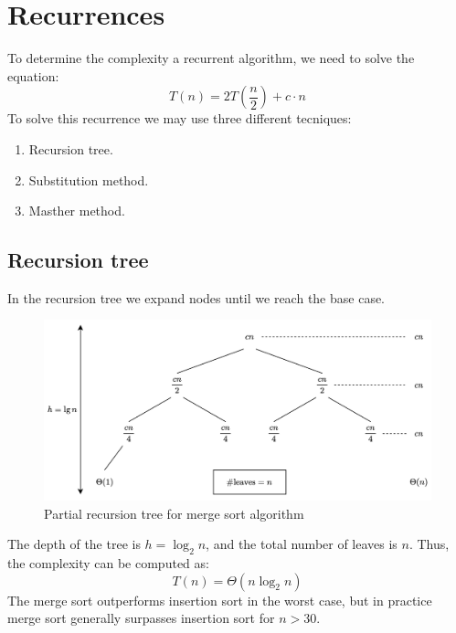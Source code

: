 \section{Recurrences}

To determine the complexity a recurrent algorithm, we need to solve the equation:
\[T(n)=2T\left(\frac{n}{2}\right)+c\cdot n\]
To solve this recurrence we may use three different tecniques: 
\begin{enumerate}
    \item Recursion tree.
    \item Substitution method.
    \item Masther method. 
\end{enumerate}

\subsection{Recursion tree}
In the recursion tree we expand nodes until we reach the base case. 
\begin{figure}[H]
    \centering
    \includegraphics[width=0.75\linewidth]{images/tree.png}
    \caption{Partial recursion tree for merge sort algorithm}
\end{figure}
The depth of the tree is $h=\log_2n$, and the total number of leaves is $n$. 
Thus, the complexity can be computed as:
\[T(n)=\Theta(n\log_2n)\]
The merge sort outperforms insertion sort in the worst case, but in practice merge sort generally surpasses insertion sort for $n > 30$.

